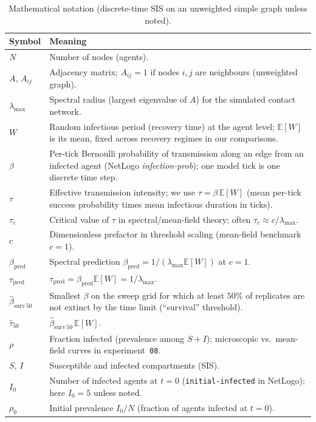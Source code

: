 \documentclass[11pt,a4paper]{article}
\begin{document}
\begin{table}[H]
  \centering
  \small
  \caption{Mathematical notation (discrete-time SIS on an unweighted simple graph unless noted).}
  \label{tab:notation}
  \begin{tabularx}{\linewidth}{@{}l X@{}}
    \toprule
    \textbf{Symbol} & \textbf{Meaning} \\
    \midrule
    $N$ & Number of nodes (agents). \\
    $A$, $A_{ij}$ & Adjacency matrix; $A_{ij}{=}1$ if nodes $i,j$ are neighbours (unweighted graph). \\
    $\lambda_{\max}$ & Spectral radius (largest eigenvalue of $A$) for the simulated contact network. \\
    $W$ & Random infectious period (recovery time) at the agent level; $\mathbb{E}[W]$ is its mean, fixed across recovery regimes in our comparisons. \\
    $\beta$ & Per-tick Bernoulli probability of transmission along an edge from an infected agent (NetLogo \emph{infection-prob}); one model tick is one discrete time step. \\
    $\tau$ & Effective transmission intensity; we use $\tau=\beta\,\mathbb{E}[W]$ (mean per-tick success probability times mean infectious duration in ticks). \\
    $\tau_c$ & Critical value of $\tau$ in spectral/mean-field theory; often $\tau_c\approx c/\lambda_{\max}$. \\
    $c$ & Dimensionless prefactor in threshold scaling (mean-field benchmark $c{=}1$). \\
    $\beta_{\mathrm{pred}}$ & Spectral prediction $\beta_{\mathrm{pred}}=1/(\lambda_{\max}\mathbb{E}[W])$ at $c{=}1$. \\
    $\tau_{\mathrm{pred}}$ & $\tau_{\mathrm{pred}}=\beta_{\mathrm{pred}}\mathbb{E}[W]=1/\lambda_{\max}$. \\
    $\hat{\beta}_{\mathrm{surv}\,50}$ & Smallest $\beta$ on the sweep grid for which at least $50\%$ of replicates are not extinct by the time limit (``survival'' threshold). \\
    $\hat{\tau}_{50}$ & $\hat{\beta}_{\mathrm{surv}\,50}\,\mathbb{E}[W]$. \\
    $\rho$ & Fraction infected (prevalence among $S{+}I$); microscopic vs.\ mean-field curves in experiment~\texttt{08}. \\
    $S$, $I$ & Susceptible and infected compartments (SIS). \\
    $I_0$ & Number of infected agents at $t{=}0$ (\texttt{initial-infected} in NetLogo); here $I_0{=}5$ unless noted. \\
    $\rho_0$ & Initial prevalence $I_0/N$ (fraction of agents infected at $t{=}0$). \\
    \bottomrule
  \end{tabularx}
\end{table}
\end{document}
